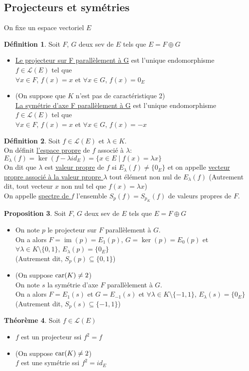 \documentclass[10pt,a4paper]{article}
\theoremstyle{definition}
\newtheorem{proposition}{Proposition}[section]
\newtheorem{theorem}[proposition]{Théorème}
\newtheorem{definition}[proposition]{Définition}
\DeclareMathOperator{\im}{im}
\begin{document}
\pagebreak

\subsection{Projecteurs et symétries}
On fixe un espace vectoriel $E$
\begin{definition}
Soit $F$, $G$ deux sev de $E$ tels que $E = F \oplus G$
\begin{itemize}
\item \uline{Le projecteur sur F parallèlement à G} est l'unique endomorphisme $f \in \mathcal{L}(E)$ tel que \\
$\forall x \in F$, $f(x) = x$ et $\forall x \in G$, $f(x) = 0_E$
\item (On suppose que $K$ n'est pas de caractéristique 2) \\
\uline{La symétrie d'axe F parallèlement à G} est l'unique endomorphisme $f \in \mathcal{L}(E)$ tel que \\
$\forall x \in F$, $f(x) = x$ et $\forall x \in G$, $f(x) = -x$
\end{itemize}
\end{definition}
\begin{definition}
Soit $f \in \mathcal{L}(E)$ et $\lambda \in K$. \\
On définit \uline{l'espace propre} de $f$ associé à $\lambda$: $E_\lambda(f) = \ker(f - \lambda id_E) = \{ x \in E \mid f(x) = \lambda x \}$ \\
On dit que $\lambda$ est \uline{valeur propre} de $f$ si $E_\lambda(f) \neq \{ 0_E \}$ et on appelle \uline{vecteur propre associé à la valeur propre $\lambda$} tout élément non nul de $E_\lambda(f)$ (Autrement dit, tout vecteur $x$ non nul tel que $f(x) = \lambda x$) \\
On appelle \uline{spectre de $f$} l'ensemble $S_p(f) = S_{p_K}(f)$ de valeurs propres de $F$.
\end{definition}
\begin{proposition}
Soit $F$, $G$ deux sev de $E$ tels que $E = F \oplus G$
\begin{itemize}
\item On note $p$ le projecteur sur $F$ parallèlement à $G$. \\
On a alors $F = \im(p) = E_1(p)$, $G = \ker(p) = E_0(p)$ et $\forall \lambda \in K \setminus \{ 0, 1\}$, $E_\lambda(p) = \{ 0_E \}$ \\
(Autrement dit, $S_p(p) \subseteq \{ 0, 1 \}$)
\item (On suppose $\textnormal{car}(K) \neq 2$) \\
On note $s$ la symétrie d'axe $F$ parallèlement à $G$. \\
On a alors $F = E_1(s)$ et $G = E_{-1}(s)$ et $\forall \lambda \in K \setminus \{ -1, 1 \}$, $E_\lambda(s) = \{ 0_E \}$ \\
(Autrement dit, $S_p(s) \subseteq \{ -1, 1 \}$)
\end{itemize}
\end{proposition}
\begin{theorem}
Soit $f \in \mathcal{L}(E)$
\begin{itemize}
\item $f$ est un projecteur ssi $f^2 = f$
\item (On suppose $\textnormal{car}(K) \neq 2$) \\
$f$ est une symétrie ssi $f^2 = id_E$
\end{itemize}
\end{theorem}
\end{document}
